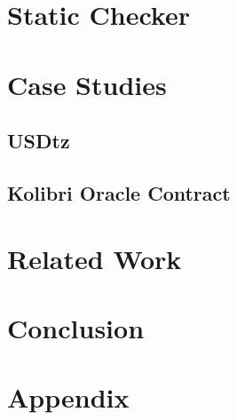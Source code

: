 \documentclass[a4paper,UKenglish,cleveref, autoref, thm-restate]{lipics-v2021}
\begin{document}
\section {Static Checker}

\section {Case Studies}
\subsection{USDtz}
\subsection{Kolibri Oracle Contract}
\section {Related Work}
\section {Conclusion}
\section {Appendix}
\end{document}

